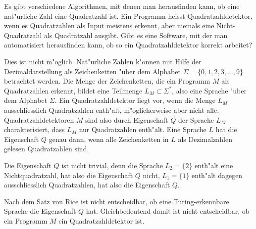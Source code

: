 Es gibt verschiedene Algorithmen, mit denen man herausfinden kann, ob
eine nat"urliche Zahl eine Quadratzahl ist.
Ein Programm heisst Quadratzahldetektor, wenn es Quadratzahlen
als Input meistens erkennt, aber niemals eine Nicht-Qua\-dratzahl
als Quadratzahl ausgibt. Gibt es eine Software, mit der man automatisiert
herausfinden kann, ob so ein Quadratzahldetektor korrekt arbeitet?

\begin{loesung}
Dies ist nicht m"oglich. 
Nat"urliche Zahlen k"onnen mit Hilfe der Dezimaldarstellung als 
Zeichenketten "uber dem Alphabet $\Sigma=\{0,1,2,3,\dots,9\}$
betrachtet werden.
Die Menge der Zeichenketten, die ein Programm $M$ als Quadratzahlen
erkennt, bildet eine Teilmenge $L_M\subset\Sigma^*$, also eine Sprache
"uber dem Alphabet $\Sigma$. Ein Quadratzahldetektor liegt vor, wenn
die Menge $L_M$ ausschliesslich Quadratzahlen enth"alt, m"oglicherweise
aber nicht alle. Quadratzahldetektoren $M$ sind also durch Eigenschaft
$Q$ der Sprache $L_M$ charakterisiert, dass $L_M$ nur Quadratzahlen
enth"alt. Eine Sprache $L$ hat die Eigenschaft $Q$ genau dann, wenn
alle Zeichenketten in $L$ als Dezimalzahlen gelesen Quadratzahlen sind.

Die Eigenschaft $Q$ ist nicht trivial, denn die Sprache 
$L_2=\{2\}$ enth"alt eine Nichtquadratzahl, hat also die Eigenschaft $Q$
nicht, $L_1=\{1\}$ enth"alt dagegen aus\-schliess\-lich Quadratzahlen, hat
also die Eigenschaft $Q$.

Nach dem Satz von Rice ist nicht entscheidbar, ob eine Turing-erkennbare
Sprache die Eigenschaft $Q$ hat. Gleichbedeutend damit ist
nicht entscheidbar, ob ein Programm $M$ ein Quadratzahldetektor ist.
\end{loesung}

